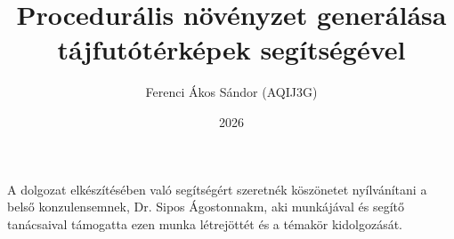 \documentclass[
	12pt
]{elteikthesis}[2026/01/26]
\title{Procedurális növényzet generálása tájfutótérképek segítségével} %
\date{2026} %
\author{Ferenci Ákos Sándor (AQIJ3G)}
\affiliation{egyetemi adjunktus} %
\begin{document}


\maketitle 

\tableofcontents
\cleardoublepage


\cleardoublepage


\cleardoublepage


\cleardoublepage


\cleardoublepage

\chapter*{\acklabel}

A dolgozat elkészítésében való segítségért szeretnék köszönetet nyílvánítani a belső konzulensemnek, Dr. Sipos Ágostonnakm, aki munkájával és segítő tanácsaival támogatta ezen munka létrejöttét és a témakör kidolgozását.


\appendix


{}
\printbibliography[title=\biblabel]
\cleardoublepage

{}
\listoffigures
\cleardoublepage

{}
\listoftables
\cleardoublepage

{}
\listofalgorithms
\cleardoublepage

{}
\lstlistoflistings
\cleardoublepage

\printnomenclature
\end{document}
